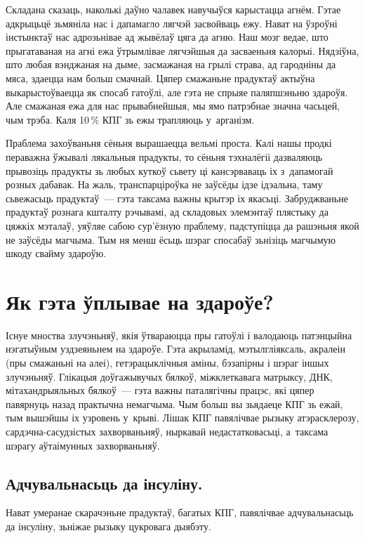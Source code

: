 Складана сказаць, наколькі даўно чалавек навучыўся карыстацца агнём. Гэтае адкрыцьцё зьмяніла нас і дапамагло лягчэй засвойваць ежу. Нават на ўзроўні інстынктаў нас адрозьнівае ад жывёлаў цяга да агню. Наш мозг ведае, што прыгатаваная на агні ежа ўтрымлівае лягчэйшыя да засваеньня калорыі. Нядзіўна, што любая вэнджаная на дыме, засмажаная на грылі страва, ад гародніны да мяса, здаецца нам больш смачнай. Цяпер смажаньне прадуктаў актыўна выкарыстоўваецца як спосаб гатоўлі, але гэта не спрыяе паляпшэньню здароўя. Але смажаная ежа для нас прывабнейшыя, мы ямо патрэбнае значна часьцей, чым трэба. Каля 10\,\% КПГ зь ежы трапляюць у~арганізм.


Праблема захоўваньня сёньня вырашаецца вельмі проста. Калі нашы продкі пераважна ўжывалі лякальныя прадукты, то сёньня тэхналёгіі дазваляюць прывозіць прадукты зь любых куткоў сьвету ці кансэрваваць іх з~дапамогай розных дабавак. На жаль, транспарціроўка не заўсёды ідзе ідэальна, таму сьвежасьць прадуктаў~--- гэта таксама важны крытэр іх якасьці. Забруджваньне прадуктаў рознага кшталту рэчывамі, ад складовых элемэнтаў плястыку да цяжкіх мэталаў, уяўляе сабою сур'ёзную праблему, падступіцца да рашэньня якой не заўсёды магчыма. Тым ня менш ёсьць шэраг спосабаў зьнізіць магчымую шкоду свайму здароўю.

\section{Як гэта ўплывае на здароўе?}

Існуе мноства злучэньняў, якія ўтвараюцца пры гатоўлі і валодаюць патэнцыйна нэгатыўным уздзеяньнем на здароўе. Гэта акрыламід, мэтылгліяксаль, акралеін (пры смажаньні на алеі), гетэрацыклічныя аміны, бэзапірны і шэраг іншых злучэньняў. Глікацыя доўгажывучых бялкоў, міжклеткавага матрыксу, ДНК, мітахандрыяльных бялкоў~--- гэта важны паталягічны працэс, які цяпер павярнуць назад практычна немагчыма. Чым больш вы зьядаеце КПГ зь ежай, тым вышэйшы іх узровень у~крыві. Лішак КПГ павялічвае рызыку атэрасклерозу, сардэчна-сасудзістых захворваньняў, ныркавай недастатковасьці, а~таксама шэрагу аўтаімунных захворваньняў.

\subsection{Адчувальнасьць да інсуліну.}
Нават умеранае скарачэньне прадуктаў, багатых КПГ, павялічвае адчувальнасьць да інсуліну, зьніжае рызыку цукровага дыябэту.


